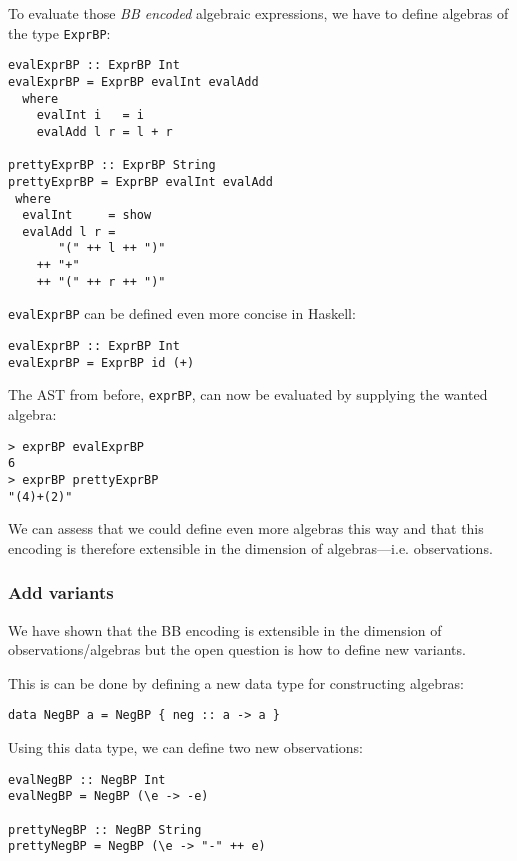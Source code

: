 To evaluate those \emph{BB encoded} algebraic expressions, we have to define
algebras of the type \texttt{ExprBP}:

\begin{lstlisting}
evalExprBP :: ExprBP Int
evalExprBP = ExprBP evalInt evalAdd
  where
    evalInt i   = i
    evalAdd l r = l + r

prettyExprBP :: ExprBP String
prettyExprBP = ExprBP evalInt evalAdd
 where
  evalInt     = show
  evalAdd l r =
       "(" ++ l ++ ")"
    ++ "+"
    ++ "(" ++ r ++ ")"
\end{lstlisting}

\texttt{evalExprBP} can be defined even more concise in Haskell:

\begin{lstlisting}
evalExprBP :: ExprBP Int
evalExprBP = ExprBP id (+)
\end{lstlisting}

The AST from before, \texttt{exprBP}, can now be evaluated by supplying the
wanted algebra:

\begin{lstlisting}
> exprBP evalExprBP
6
> exprBP prettyExprBP
"(4)+(2)"
\end{lstlisting}

We can assess that we could define even more algebras this way and that this
encoding is therefore extensible in the dimension of algebras—i.e. observations.

\subsubsection{Add variants}

We have shown that the BB encoding is extensible in the dimension of
observations/algebras but the open question is how to define new variants.

This is can be done by defining a new data type for constructing algebras:

\begin{lstlisting}
data NegBP a = NegBP { neg :: a -> a }
\end{lstlisting}

Using this data type, we can define two new observations:

\begin{lstlisting}
evalNegBP :: NegBP Int
evalNegBP = NegBP (\e -> -e)

prettyNegBP :: NegBP String
prettyNegBP = NegBP (\e -> "-" ++ e)
\end{lstlisting}

